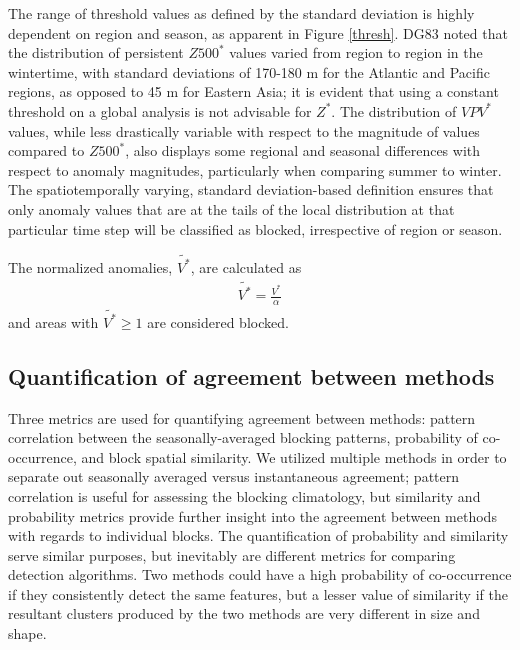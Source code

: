 \documentclass[smallextended]{svjour3}       %
\numberwithin{equation}{section}
\begin{document}
The range of threshold values as defined by the standard deviation is highly dependent on region and season, as apparent in Figure \ref{thresh}. DG83 noted that the distribution of persistent $Z500^*$ values varied from region to region in the wintertime, with standard deviations of 170-180 m for the Atlantic and Pacific regions, as opposed to 45 m for Eastern Asia; it is evident that using a constant threshold on a global analysis is not advisable for $Z^*$. The distribution of $VPV^*$ values, while less drastically variable with respect to the magnitude of values compared to $Z500^*$, also displays some regional and seasonal differences with respect to anomaly magnitudes, particularly when comparing summer to winter. The spatiotemporally varying, standard deviation-based definition ensures that only anomaly values that are at the tails of the local distribution at that particular time step will be classified as blocked, irrespective of region or season.  

The normalized anomalies, $\widetilde{V^*}$, are calculated as
 \begin{eqnarray}
 \widetilde{V^*} = \frac{V^*}{\alpha}
 \end{eqnarray}
\noindent 
and areas with $\widetilde{V^*}\geq 1$ are considered blocked.

\subsection{Quantification of agreement between methods}\label{simsec}

Three metrics are used for quantifying agreement between methods: 
pattern correlation between the seasonally-averaged blocking patterns, probability of co-occurrence, and block spatial similarity.  We utilized multiple methods in order to separate out seasonally averaged versus instantaneous agreement; pattern correlation is useful for assessing the blocking climatology, but similarity and probability metrics provide further insight into the agreement between methods with regards to individual blocks. The quantification of probability and similarity serve similar purposes, but inevitably are different metrics for comparing detection algorithms. Two methods could have a high probability of co-occurrence if they consistently detect the same features, but a lesser value of similarity if the resultant clusters produced by the two methods are very different in size and shape.
\end{document}
